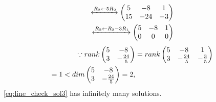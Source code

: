 \documentclass[journal,12pt,twocolumn]{IEEEtran}
\renewcommand\thesection{\arabic{section}}
\begin{document}
\begin{enumerate}[label=\thesection.\arabic*.,ref=\thesection.\theenumi]
\begin{align}
\xleftrightarrow {R_2\leftarrow 5R_2}\begin{pmatrix} 5 & -8 & 1\\15 & -24 & -3\end{pmatrix} 
\\
\xleftrightarrow {R_2\leftarrow R_2 - 3R_1}\begin{pmatrix} 5 & -8 & 1\\0 & 0 & 0\end{pmatrix} 
\end{align}
%
%
\begin{align}
\because rank \begin{pmatrix} 5 & -8\\3 & -\frac{24}{5}\end{pmatrix} &= rank \begin{pmatrix} 5 & -8 & 1 \\3 & -\frac{24}{5} & -\frac{3}{5}\end{pmatrix} 
\\
= 1 < dim \begin{pmatrix} 5 & -8\\3 & -\frac{24}{5}\end{pmatrix} =2,
\end{align}
%
\eqref{eq:line_check_sol3} has infinitely many solutions.
%
%
\end{enumerate}
\end{document}
